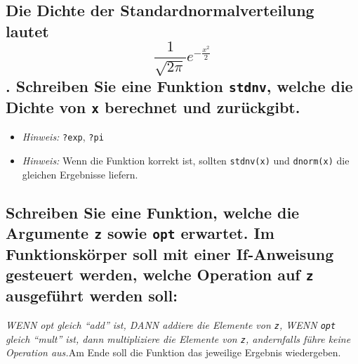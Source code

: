 \documentclass[12pt,a4paper]{article}
\begin{document}
\hypertarget{die-dichte-der-standardnormalverteilung-lautet-displaystyle-frac1sqrt2pi-e-fracx22.-schreiben-sie-eine-funktion-stdnv-welche-die-dichte-von-x-berechnet-und-zuruxfcckgibt.}{%
\subsection{\texorpdfstring{Die Dichte der Standardnormalverteilung
lautet \[\displaystyle \frac{1}{\sqrt{2\pi}} e^{-\frac{x^2}{2}}\].
Schreiben Sie eine Funktion \texttt{stdnv}, welche die Dichte von
\texttt{x} berechnet und
zurückgibt.}{Die Dichte der Standardnormalverteilung lautet \textbackslash displaystyle \textbackslash frac\{1\}\{\textbackslash sqrt\{2\textbackslash pi\}\} e\^{}\{-\textbackslash frac\{x\^{}2\}\{2\}\}. Schreiben Sie eine Funktion stdnv, welche die Dichte von x berechnet und zurückgibt.}}\label{die-dichte-der-standardnormalverteilung-lautet-displaystyle-frac1sqrt2pi-e-fracx22.-schreiben-sie-eine-funktion-stdnv-welche-die-dichte-von-x-berechnet-und-zuruxfcckgibt.}}

\begin{itemize}
  \item \textit{Hinweis:} \texttt{?exp}, \texttt{?pi}
  \item \textit{Hinweis:} Wenn die Funktion korrekt ist, sollten \texttt{stdnv(x)} und \texttt{dnorm(x)} die gleichen Ergebnisse liefern.
\end{itemize}

\hypertarget{schreiben-sie-eine-funktion-welche-die-argumente-z-sowie-opt-erwartet.-im-funktionskuxf6rper-soll-mit-einer-if-anweisung-gesteuert-werden-welche-operation-auf-z-ausgefuxfchrt-werden-soll}{%
\subsection{\texorpdfstring{Schreiben Sie eine Funktion, welche die
Argumente \texttt{z} sowie \texttt{opt} erwartet. Im Funktionskörper
soll mit einer If-Anweisung gesteuert werden, welche Operation auf
\texttt{z} ausgeführt werden
soll:}{Schreiben Sie eine Funktion, welche die Argumente z sowie opt erwartet. Im Funktionskörper soll mit einer If-Anweisung gesteuert werden, welche Operation auf z ausgeführt werden soll:}}\label{schreiben-sie-eine-funktion-welche-die-argumente-z-sowie-opt-erwartet.-im-funktionskuxf6rper-soll-mit-einer-if-anweisung-gesteuert-werden-welche-operation-auf-z-ausgefuxfchrt-werden-soll}}

\emph{WENN opt gleich ``add'' ist, DANN addiere die Elemente von
\texttt{z}, WENN \texttt{opt} gleich ``mult'' ist, dann multipliziere
die Elemente von \texttt{z}, andernfalls führe keine Operation
aus.}\newline\newline Am Ende soll die Funktion das jeweilige Ergebnis
wiedergeben.
\end{document}
